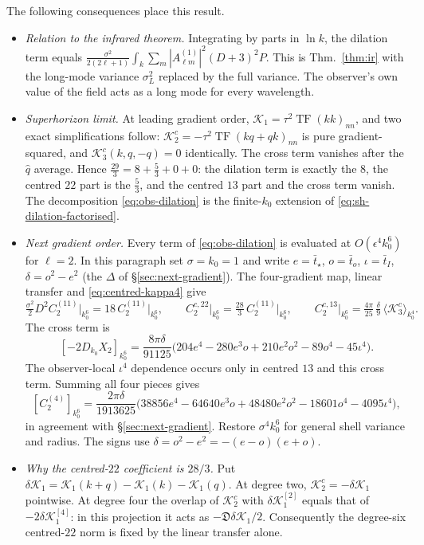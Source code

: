 \documentclass[11pt]{article}
\theoremstyle{definition}
\theoremstyle{remark}
\newcommand{\eps}{\epsilon}
\newcommand{\ens}[1]{\langle #1\rangle}
\newcommand{\TF}{\operatorname{TF}}
\begin{document}
The following consequences place this result.
\begin{itemize}
\item \emph{Relation to the infrared theorem.} Integrating by parts in $\ln k$, the
  dilation term equals $\frac{\sigma^2}{2(2\ell+1)}\int_k\sum_m|A^{(1)}_{\ell m}|^2(D+3)^2P$.
  This is Thm.~\ref{thm:ir} with the long-mode variance $\sigma_L^2$ replaced by the full
  variance. The observer's own value of the field acts as a long mode for every wavelength.
\item \emph{Superhorizon limit.} At leading gradient order, $\mathcal K_1=\tau^2\TF(kk)_{nn}$,
  and two exact simplifications follow:
  $\mathcal K^c_2=-\tau^2\TF(kq+qk)_{nn}$ is pure gradient-squared, and
  $\mathcal K^c_3(k,q,-q)=0$ identically. The cross term vanishes after the $\hat q$ average.
  Hence $\frac{29}3=8+\frac53+0+0$: the dilation term is exactly the $8$, the centred $22$
  part is the $\frac53$, and the centred $13$ part and the cross term vanish. The
  decomposition \eqref{eq:obs-dilation} is the finite-$k_0$ extension of
  \eqref{eq:sh-dilation-factorised}.
\item \emph{Next gradient order.} Every term of \eqref{eq:obs-dilation} is evaluated at
  $O(\eps^4k_0^6)$ for $\ell=2$. In this paragraph set $\sigma=k_0=1$ and write
  $e=\bar t_\star$, $o=\bar t_o$, $\iota=\bar t_I$, $\delta=o^2-e^2$ (the $\Delta$ of
  \S\ref{sec:next-gradient}). The four-gradient map, linear transfer and \eqref{eq:centred-kappa4} give
  \[
   \tfrac{\sigma^2}2D^2C^{(11)}_2\big|_{k_0^6}=18\,C^{(11)}_2\big|_{k_0^6},\qquad
   C^{c,22}_2\big|_{k_0^6}=\tfrac{28}3\,C^{(11)}_2\big|_{k_0^6},\qquad
   C^{c,13}_2\big|_{k_0^6}=\tfrac{4\pi}{25}\,\tfrac{\delta}{9}\,
   \ens{\mathcal K^c_3}_{k_0^4}.
  \]
  The cross term is
  \begin{equation}\label{eq:obs-cross-six}
   [-2D_{k_0}X_2]_{k_0^6}=\frac{8\pi\delta}{91125}
   \big(204e^4-280e^3o+210e^2o^2-89o^4-45\iota^4\big).
  \end{equation}
  The observer-local $\iota^4$ dependence occurs only in centred $13$ and this cross term.
  Summing all four pieces gives
  \begin{equation}\label{eq:obs-total-six}
   [C_2^{(4)}]_{k_0^6}=\frac{2\pi\delta}{1913625}
   \big(38856e^4-64640e^3o+48480e^2o^2-18601o^4-4095\iota^4\big),
  \end{equation}
  in agreement with \S\ref{sec:next-gradient}. Restore $\sigma^4k_0^6$ for general shell
  variance and radius. The signs use $\delta=o^2-e^2=-(e-o)(e+o)$.
\item \emph{Why the centred-$22$ coefficient is $28/3$.} Put
  $\delta\mathcal K_1=\mathcal K_1(k+q)-\mathcal K_1(k)-\mathcal K_1(q)$.
  At degree two, $\mathcal K^c_2=-\delta\mathcal K_1$ pointwise. At degree four the overlap
  of $\mathcal K^c_2$ with $\delta\mathcal K_1^{[2]}$ equals that of
  $-2\delta\mathcal K_1^{[4]}$: in this projection it acts as
  $-\mathfrak D\delta\mathcal K_1/2$. Consequently the degree-six centred-$22$ norm is
  fixed by the linear transfer alone.


\end{itemize}
\end{document}
